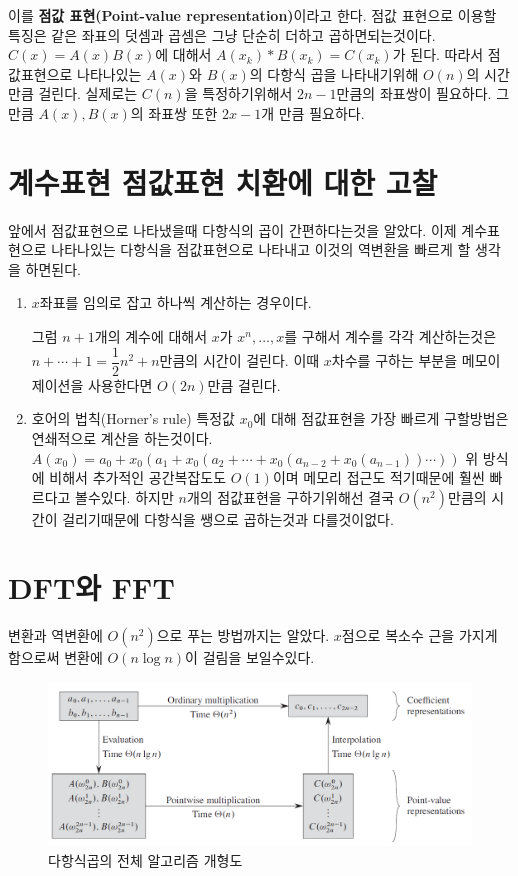 이를 \textbf{점값 표현(Point-value representation)}이라고 한다.
점값 표현으로 이용할 특징은 같은 좌표의 덧셈과 곱셈은 그냥 단순히 더하고 곱하면되는것이다. 
$C(x) = A(x)B(x)$에 대해서 $A(x_k)*B(x_k) = C(x_k)$가 된다. 따라서 점값표현으로 나타나있는 $A(x)$와 $B(x)$의 다항식 곱을 나타내기위해 $O(n)$의 시간만큼 걸린다. 실제로는 $C(n)$을 특정하기위해서 $2n-1$만큼의 좌표쌍이 필요하다.
그만큼 $A(x), B(x)$의 좌표쌍 또한 $2x-1$개 만큼 필요하다.

\section{계수표현 점값표현 치환에 대한 고찰}
앞에서 점값표현으로 나타냈을때 다항식의 곱이 간편하다는것을 알았다. 이제 계수표현으로 나타나있는 다항식을 점값표현으로 나타내고 이것의 역변환을 빠르게 할 생각을 하면된다.

\begin{enumerate}
    \item $x$좌표를 임의로 잡고 하나씩 계산하는 경우이다.

    그럼 $n+1$개의 계수에 대해서 $x$가 $x^n, ... , x$를 구해서 계수를 각각 계산하는것은 $n + \cdots + 1 = \dfrac{1}{2}n^2 + n$만큼의 시간이 걸린다. 이때 $x$차수를 구하는 부분을 메모이제이션을 사용한다면 $O(2n)$만큼 걸린다.

    \item 호어의 법칙(Horner's rule)
        특정값 $x_0$에 대해 점값표현을 가장 빠르게 구할방법은 연쇄적으로 계산을 하는것이다.
        $A(x_0) = a_0 + x_0(a_1 + x_0(a_2+ \cdots + x_0(a_{n-2} + x_0(a_{n-1})) \cdots ))$
        위 방식에 비해서 추가적인 공간복잡도도 $O(1)$이며 메모리 접근도 적기때문에 훨씬 빠르다고 볼수있다.
        하지만 $n$개의 점값표현을 구하기위해선 결국 $O(n^2)$만큼의 시간이 걸리기때문에 다항식을 쌩으로 곱하는것과 다를것이없다.
\end{enumerate}

\section{DFT와 FFT}
변환과 역변환에 $O(n^2)$으로 푸는 방법까지는 알았다. 
$x$점으로 복소수 근을 가지게 함으로써 변환에 $O(n \log n)$이 걸림을 보일수있다.

\begin{figure}[h!]
    \includegraphics[scale=0.5]{./FFT/pic/pic1.PNG}
    \caption{다항식곱의 전체 알고리즘 개형도}
\end{figure}


